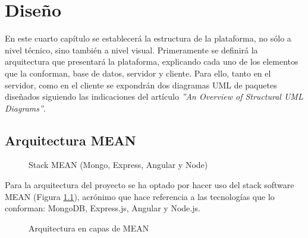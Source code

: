 \chapter{Diseño} \label{disenio}
En este cuarto capítulo se establecerá la estructura de la plataforma, no sólo a nivel técnico, sino también a nivel visual. Primeramente se definirá la arquitectura que presentará la plataforma, explicando cada uno de los elementos que la conforman, base de datos, servidor y cliente. Para ello, tanto en el servidor, como en el cliente se expondrán dos diagramas UML de paquetes diseñados siguiendo las indicaciones del artículo \textit{''An Overview of Structural
UML Diagrams''}\cite{bhatt2021overview}.

\section{Arquitectura MEAN}
\begin{figure}[H]
    \caption{Stack MEAN (Mongo, Express, Angular y Node)}
    \label{mean}
\end{figure}

Para la arquitectura del proyecto se ha optado por hacer uso del stack software MEAN \cite{nirgudkar2017mean} (Figura \ref{mean}), acrónimo que hace referencia a las tecnologías que lo conforman: MongoDB, Express.js, Angular y Node.js. 

\begin{figure}[H]
    \caption{Arquitectura en capas de MEAN}
    \label{mean-architecture}
\end{figure}

